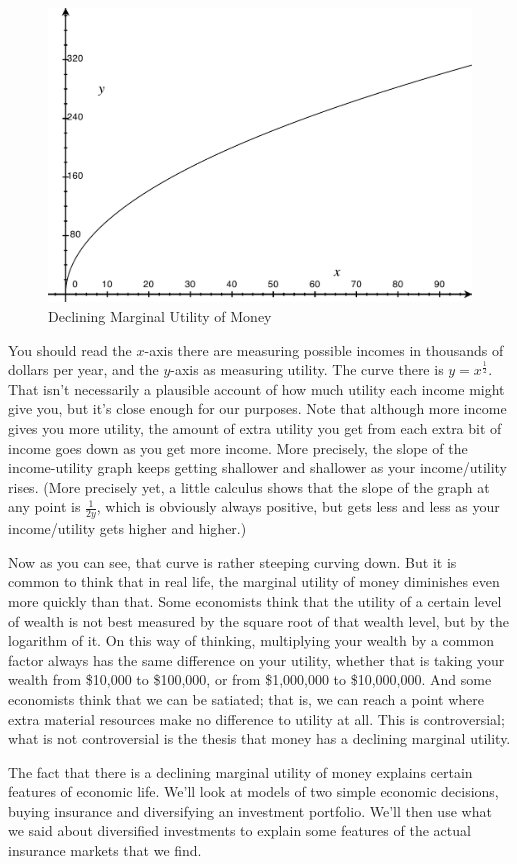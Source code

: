 \begin{figure}[ht]
\centering
\includegraphics[width=0.6\linewidth]{./img/decutil}
\caption{Declining Marginal Utility of Money}
\label{fig:a Declining Marginal Utility of Money}
\end{figure}
\noindent You should read the $x$-axis there are measuring possible incomes in thousands of dollars per year, and the $y$-axis as measuring utility. The curve there is $y = x^{\frac{1}{2}}$. That isn't necessarily a plausible account of how much utility each income might give you, but it's close enough for our purposes. Note that although more income gives you more utility, the amount of extra utility you get from each extra bit of income goes down as you get more income. More precisely, the slope of the income-utility graph keeps getting shallower and shallower as your income/utility rises. (More precisely yet, a little calculus shows that the slope of the graph at any point is $\frac{1}{2y}$, which is obviously always positive, but gets less and less as your income/utility gets higher and higher.)

Now as you can see, that curve is rather steeping curving down. But it is common to think that in real life, the marginal utility of money diminishes even more quickly than that. Some economists think that the utility of a certain level of wealth is not best measured by the square root of that wealth level, but by the logarithm of it. On this way of thinking, multiplying your wealth by a common factor always has the same difference on your utility, whether that is taking your wealth from \$10,000 to \$100,000, or from \$1,000,000 to \$10,000,000. And some economists think that we can be satiated; that is, we can reach a point where extra material resources make no difference to utility at all. This is controversial; what is not controversial is the thesis that money has a declining marginal utility.

The fact that there is a declining marginal utility of money explains certain features of economic life. We'll look at models of two simple economic decisions, buying insurance and diversifying an investment portfolio. We'll then use what we said about diversified investments to explain some features of the actual insurance markets that we find.

